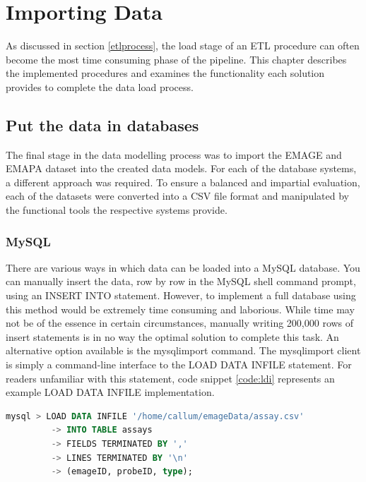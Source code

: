 \chapter{Importing Data}\label{dataload}
As discussed in section \ref{etlprocess}, the load stage of an ETL procedure can often become the most time consuming phase of the pipeline. This chapter describes the implemented procedures and examines the functionality each solution provides to complete the data load process.

\section{Put the data in databases}\label{loadsection}
The final stage in the data modelling process was to import the EMAGE and EMAPA dataset into the created data models. For each of the database systems, a different approach was required. To ensure a balanced and impartial evaluation, each of the datasets were converted into a CSV file format and manipulated by the functional tools the respective systems provide.

\subsection{MySQL}
There are various ways in which data can be loaded into a MySQL database. You can manually insert the data, row by row in the MySQL shell command prompt, using an INSERT INTO statement. However, to implement a full database using this method would be extremely time consuming and laborious. While time may not be of the essence in certain circumstances, manually writing 200,000 rows of insert statements is in no way the optimal solution to complete this task. An alternative option available is the mysqlimport command. The mysqlimport client is simply a command-line interface to the LOAD DATA INFILE statement. For readers unfamiliar with this statement, code snippet \ref{code:ldi} represents an example LOAD DATA INFILE implementation.
\newpage
\begin{lstlisting}[language=SQL, caption=Example LOAD DATA INFILE statement., label=code:ldi]
mysql > LOAD DATA INFILE '/home/callum/emageData/assay.csv'
	 	 -> INTO TABLE assays
		 -> FIELDS TERMINATED BY ','
		 -> LINES TERMINATED BY '\n'
		 -> (emageID, probeID, type);
\end{lstlisting}

